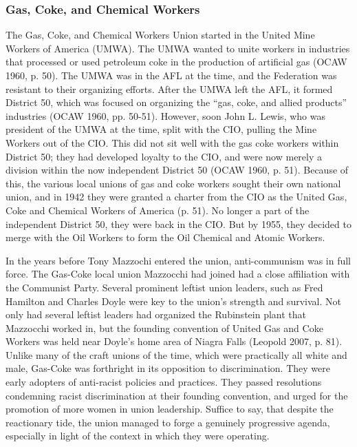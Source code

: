 \subsubsection{Gas, Coke, and Chemical Workers}

The Gas, Coke, and Chemical Workers Union started in the United Mine Workers of America (UMWA). The UMWA wanted to unite workers in industries that processed or used petroleum coke in the production of artificial gas (OCAW 1960, p. 50). The UMWA was in the AFL at the time, and the Federation was resistant to their organizing efforts. After the UMWA left the AFL, it formed District 50, which was focused on organizing the “gas, coke, and allied products” industries (OCAW 1960, pp. 50-51). However, soon John L. Lewis, who was president of the UMWA at the time, split with the CIO, pulling the Mine Workers out of the CIO. This did not sit well with the gas coke workers within District 50; they had developed loyalty to the CIO, and were now merely a division within the now independent District 50 (OCAW 1960, p. 51). Because of this, the various local unions of gas and coke workers sought their own national union, and in 1942 they were granted a charter from the CIO as the United Gas, Coke and Chemical Workers of America (p. 51). No longer a part of the independent District 50, they were back in the CIO.  But by 1955, they decided to merge with the Oil Workers to form the Oil Chemical and Atomic Workers.

In the years before Tony Mazzochi entered the union, anti-communism was in full force. The Gas-Coke local union Mazzocchi had joined had a close affiliation with the Communist Party. Several prominent leftist union leaders, such as Fred Hamilton and Charles Doyle were key to the union’s strength and survival. Not only had several leftist leaders had organized the Rubinstein plant that Mazzocchi worked in, but the founding convention of United Gas and Coke Workers was held near Doyle’s home area of Niagra Falls (Leopold 2007, p. 81). Unlike many of the craft unions of the time, which were practically all white and male, Gas-Coke was forthright in its opposition to discrimination. They were early adopters of anti-racist policies and practices. They passed resolutions condemning racist discrimination at their founding convention, and urged for the promotion of more women in union leadership. Suffice to say, that despite the reactionary tide, the union managed to forge a genuinely progressive agenda, especially in light of the context in which they were operating.

